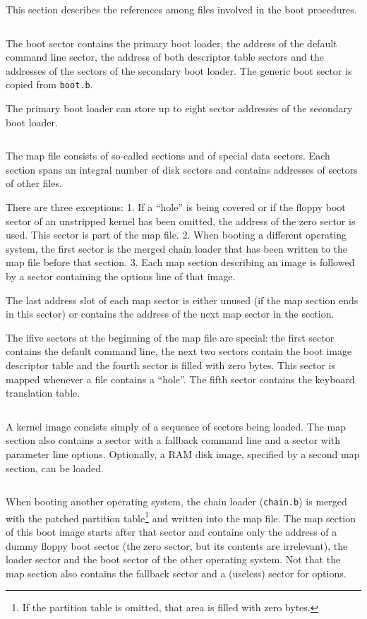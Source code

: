 This section describes the references among files involved in the boot
procedures.

$$
  
$$

The boot sector contains the primary boot loader, the address of the default
command line sector, the address of both
descriptor table sectors and the addresses of the sectors of the secondary
boot loader. The generic boot sector is copied from {\tt boot.b}.

The primary boot loader can store up to eight sector addresses of the
secondary boot loader.

$$
  
$$

The map file consists of so-called sections and of special data sectors.
Each section
spans an integral number of disk sectors and contains addresses of sectors
of other files.

There are three exceptions: 1. If a ``hole'' is being
covered or if the floppy boot sector of an unstripped kernel has been omitted,
the address of the zero sector is used. This sector is part of the
map file. 2. When booting a different operating system, the first sector is
the merged chain loader that has been written to the map file before that
section. 3. Each map section describing an image is followed by a sector
containing the options line of that image.

The last address slot of each map sector is either unused (if the map section
ends in this sector) or contains the address of the next map sector in the
section.

The ifive sectors at the beginning of the map file are special: the first
sector contains the default command line, the next
two sectors contain the boot image descriptor table and the fourth sector
is filled with zero bytes. This sector is mapped whenever a file contains
a ``hole''. The fifth sector contains the keyboard translation table.

$$
  
$$

A kernel image consists simply of a sequence of sectors being
loaded. The map section also contains a sector with a fallback command line
and a sector with parameter line options. Optionally, a RAM disk image,
specified by a second map section, can be loaded.

$$
  
$$

When booting another operating system, the chain loader ({\tt chain.b}) is
merged with the patched partition table\footnote{If the partition table is
omitted, that area is filled with zero bytes.} and written into the map file.
The map section of this boot image starts after that sector and contains only
the address of a dummy floppy boot sector (the zero sector, but its
contents are irrelevant), the loader
sector and the boot sector of the other operating system. Not that the
map section also contains the fallback sector and a (useless) sector for
options.


